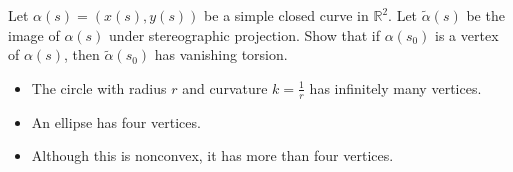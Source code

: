 \begin{exercise}
    Let $\alpha(s)=\left(x(s),y(s)\right)$ be a simple closed curve in 
    $\mathbb{R}^2$. Let $\tilde{\alpha}(s)$ be the image of $\alpha(s)$ 
    under stereographic projection. Show that if $\alpha(s_0)$ is a vertex 
    of $\alpha(s)$, then $\tilde{\alpha}(s_0)$ has vanishing torsion.
\end{exercise}
\begin{example}
    \hfill
    \begin{itemize}
        \item The circle with radius $r$ and curvature $k=\frac{1}{r}$ has infinitely many vertices.
        \begin{center}
        \end{center}
        \item An ellipse has four vertices.
        \begin{center}
        \end{center}
        \item Although this is nonconvex, it has more than four vertices.
        \begin{center}
            



\begin{tikzpicture}[x=0.75pt,y=0.75pt,yscale=-1,xscale=1]


\end{tikzpicture}
\end{center}
\end{itemize}
\end{example}

